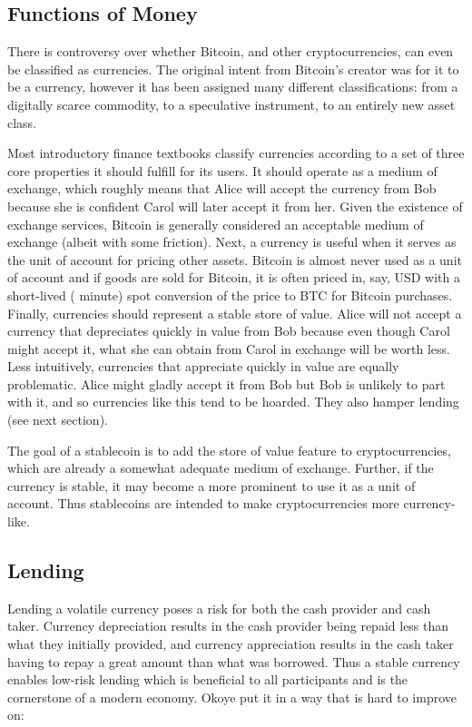 \subsection{Functions of Money}

There is controversy over whether Bitcoin, and other cryptocurrencies, can even be classified as currencies. The original intent from Bitcoin's creator was for it to be a currency, however it has been assigned many different classifications: from a digitally scarce commodity, to a speculative instrument, to an entirely new asset class.

Most introductory finance textbooks classify currencies according to a set of three core properties it should fulfill for its users. It should operate as a medium of exchange, which roughly means that Alice will accept the currency from Bob because she is confident Carol will later accept it from her. Given the existence of exchange services, Bitcoin is generally considered an acceptable medium of exchange (albeit with some friction). Next, a currency is useful when it serves as the unit of account for pricing other assets. Bitcoin is almost never used as a unit of account and if goods are sold for Bitcoin, it is often priced in, say, USD with a short-lived ( minute) spot conversion of the price to BTC for Bitcoin purchases. Finally, currencies should represent a stable store of value. Alice will not accept a currency that depreciates quickly in value from Bob because even though Carol might accept it, what she can obtain from Carol in exchange will be worth less. Less intuitively, currencies that appreciate quickly in value are equally problematic. Alice might gladly accept it from Bob but Bob is unlikely to part with it, and so currencies like this tend to be hoarded. They also hamper lending (see next section).

The goal of a stablecoin is to add the store of value feature to cryptocurrencies, which are already a somewhat adequate medium of exchange. Further, if the currency is stable, it may become a more prominent to use it as a unit of account. Thus stablecoins are intended to make cryptocurrencies more currency-like.


\subsection{Lending}

Lending a volatile currency poses a risk for both the cash provider and cash taker. Currency depreciation results in the cash provider being repaid less than what they initially provided, and currency appreciation results in the cash taker having to repay a great amount than what was borrowed. Thus a stable currency enables low-risk lending which is beneficial to all participants and is the cornerstone of a modern economy. Okoye \etal put it in a way that is hard to improve on:

